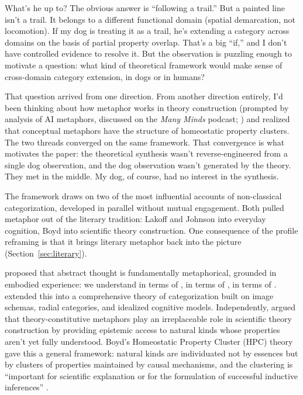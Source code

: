 \documentclass[12pt]{article}
\begin{document}
What's he up to? The obvious answer is \enquote{following a trail.} But a painted line isn't a trail. It belongs to a different functional domain (spatial demarcation, not locomotion). If my dog is treating it as a trail, he's extending a category across domains on the basis of partial property overlap. That's a big \enquote{if,} and I don't have controlled evidence to resolve it. But the observation is puzzling enough to motivate a question: what kind of theoretical framework would make sense of cross-domain category extension, in dogs or in humans?

That question arrived from one direction. From another direction entirely, I'd been thinking about how metaphor works in theory construction (prompted by  analysis of AI metaphors, discussed on the \emph{Many Minds} podcast; \citealt{cooperrider2026}) and realized that conceptual metaphors have the structure of homeostatic property clusters. The two threads converged on the same framework. That convergence is what motivates the paper: the theoretical synthesis wasn't reverse-engineered from a single dog observation, and the dog observation wasn't generated by the theory. They met in the middle. My dog, of course, had no interest in the synthesis.

The framework draws on two of the most influential accounts of non-classical categorization, developed in parallel without mutual engagement. Both pulled metaphor out of the literary tradition: Lakoff and Johnson into everyday cognition, Boyd into scientific theory construction. One consequence of the profile reframing is that it brings literary metaphor back into the picture (Section~\ref{sec:literary}).

\textcite{lakoff1980} proposed that abstract thought is fundamentally metaphorical, grounded in embodied experience: we understand  in terms of ,  in terms of ,  in terms of . \textcite{lakoff1987} extended this into a comprehensive theory of categorization built on image schemas, radial categories, and idealized cognitive models. Independently, \textcite{boyd1979} argued that theory-constitutive metaphors play an irreplaceable role in scientific theory construction by providing epistemic access to natural kinds whose properties aren't yet fully understood. Boyd's Homeostatic Property Cluster (HPC) theory \citep{boyd1989, boyd1999} gave this a general framework: natural kinds are individuated not by essences but by clusters of properties maintained by causal mechanisms, and the clustering is \enquote{important for scientific explanation or for the formulation of successful inductive inferences} \citep[526]{boyd1993metaphor}.
\end{document}
